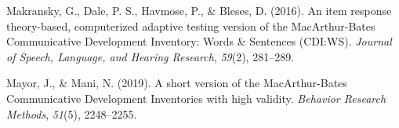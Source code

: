 \documentclass[10pt, letterpaper]{article}
\newenvironment{CSLReferences}%
  {}%
  {\par}
\begin{document}
\begin{CSLReferences}{1}{0}
\leavevmode{}%
Makransky, G., Dale, P. S., Havmose, P., \& Bleses, D. (2016). An item
response theory-based, computerized adaptive testing version of the
{M}ac{A}rthur-{B}ates {C}ommunicative {D}evelopment {I}nventory: {W}ords
\& {S}entences ({CDI:WS}). \emph{Journal of Speech, Language, and
Hearing Research}, \emph{59}(2), 281--289.

\leavevmode{}%
Mayor, J., \& Mani, N. (2019). A short version of the
{M}ac{A}rthur-{B}ates {C}ommunicative {D}evelopment {I}nventories with
high validity. \emph{Behavior Research Methods}, \emph{51}(5),
2248--2255.

\end{CSLReferences}


\end{document}
